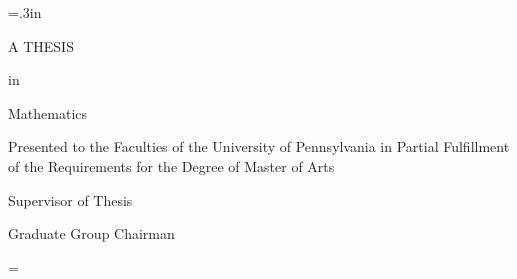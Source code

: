 \large\newlength{\oldparskip}\setlength\oldparskip{\parskip}\parskip=.3in
\thispagestyle{empty} \doublespaced
\begin{center}
\vspace*{\fill} \thetitle

\theauthor


A THESIS

in

Mathematics

\large Presented to the Faculties of the University of
Pennsylvania in Partial
 Fulfillment of the Requirements for the Degree of Master of
 Arts

\large
\theyear
\end{center}


\noindent\makebox[0in][l]{\rule[2ex]{3in}{.3mm}}
Supervisor of Thesis



\noindent\makebox[0in][l]{\rule[2ex]{3in}{.3mm}} Graduate Group
Chairman \vspace*{\fill}

\normalsize\parskip=\oldparskip

